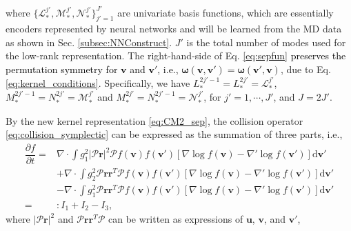 \documentclass[preprint,1p,times]{elsarticle}
\theoremstyle{definition}
\theoremstyle{remark}
\newcommand{\tcb}[1]{\textcolor{black}{#1}}
\begin{document}
where $\{\mathcal{L}_{\ast}^{j'}, \mathcal{M}_{\ast}^{j'}, \mathcal{N}_{\ast}^{j'}\}_{j'=1}^{J'}$ are univariate basis functions, which are essentially encoders represented by neural networks and will be learned from the MD data as shown in Sec. \ref{subsec:NNConstruct}. $J'$ is the total number of modes used for the low-rank representation. The right-hand-side of Eq. \eqref{eq:sepfun} \tcb{preserves the permutation symmetry for $\boldsymbol{v}$ and $\boldsymbol{v}'$, i.e., $\bm \omega(\bm{v},\bm{v}') = \bm \omega(\bm{v}',\bm{v})$}, due to Eq. \eqref{eq:kernel_conditions}. Specifically, we have  
$L_{\ast}^{2j'-1}=L_{\ast}^{2j'}=\mathcal{L}_{\ast}^{j'}$, $M_{\ast}^{2j'-1}=N_{\ast}^{2j'}=\mathcal{M}_{\ast}^{j'}$ and $M_{\ast}^{2j'}=N_{\ast}^{2j'-1}=\mathcal{N}_{\ast}^{j'}$, for $j'=1,\cdots,J'$, and $J=2J'$.


By the new kernel representation \eqref{eq:CM2_sep}, the collision operator \eqref{eq:collision_symplectic} can be expressed as the summation of three parts, i.e., 
\begin{equation}\label{eq:sim_CM2}
    \begin{aligned}
        \dfrac{\partial f}{\partial t} =& \nabla \cdot \int g_{1}^{2} |\boldsymbol{\mathcal{P}}\boldsymbol{r}|^{2} \boldsymbol{\mathcal{P}} f(\boldsymbol{v}) f(\boldsymbol{v}') \left[ \nabla \log f(\boldsymbol{v}) - \nabla'\log f(\boldsymbol{v}') \right] \mathrm{d}\boldsymbol{v}' \\
        &+ \nabla \cdot \int g_{2}^{2} \boldsymbol{\mathcal{P}} \boldsymbol{r} \boldsymbol{r}^{T} \boldsymbol{\mathcal{P}} f(\boldsymbol{v}) f(\boldsymbol{v}') \left[ \nabla \log f(\boldsymbol{v}) - \nabla'\log f(\boldsymbol{v}') \right] \mathrm{d}\boldsymbol{v}' \\
        &- \nabla \cdot \int g_{1}^{2} \boldsymbol{\mathcal{P}} \boldsymbol{r} \boldsymbol{r}^{T} \boldsymbol{\mathcal{P}} f(\boldsymbol{v}) f(\boldsymbol{v}') \left[ \nabla \log f(\boldsymbol{v}) - \nabla'\log f(\boldsymbol{v}') \right] \mathrm{d}\boldsymbol{v}' \\
        =&: I_{1} + I_{2} - I_{3},
    \end{aligned}
\end{equation}
where $|\boldsymbol{\mathcal{P}}\boldsymbol{r}|^{2}$ and $\boldsymbol{\mathcal{P}} \boldsymbol{r} \boldsymbol{r}^{T} \boldsymbol{\mathcal{P}}$ can be written as expressions of $\boldsymbol{u}$, $\boldsymbol{v}$, and $\boldsymbol{v}'$,
\end{document}

